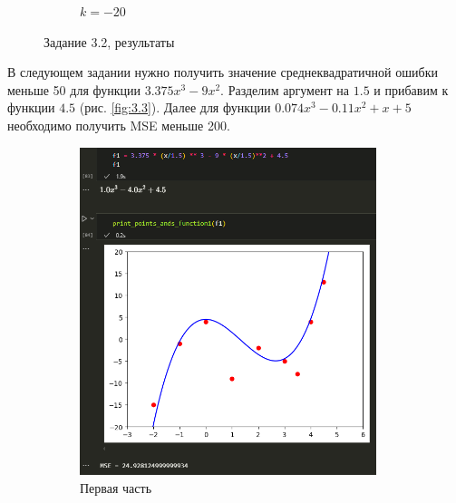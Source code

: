 \documentclass[14pt,a4paper]{extarticle}
\begin{document}
\begin{figure}[h!]
\begin{subfigure}{.5\textwidth}
        \caption{$k=-20$}
        \label{fig:3.2-2}
    \end{subfigure}

    \caption{Задание 3.2, результаты}
    \label{fig:2.1}
\end{figure}

        В следующем задании нужно получить значение среднеквадратичной
ошибки меньше 50 для функции $3.375 x ^ 3 - 9 x^2$. Разделим аргумент на $1.5$ и
прибавим к функции $4.5$ (рис. \ref{fig:3.3}). Далее для функции $0.074 x^3 - 0.11 x^2 + x + 5$
необходимо получить MSE меньше 200.

\begin{figure}[h!]
    \begin{subfigure}{.5\textwidth}
        \centering
        \includegraphics[width=0.95\textwidth]{figures/3.3-1.png}
        \caption{Первая часть}
        \label{fig:3.3.1}
    \end{subfigure}%
    \begin{subfigure}{.5\textwidth}
        \centering

\end{subfigure}
\end{figure}
\end{document}

